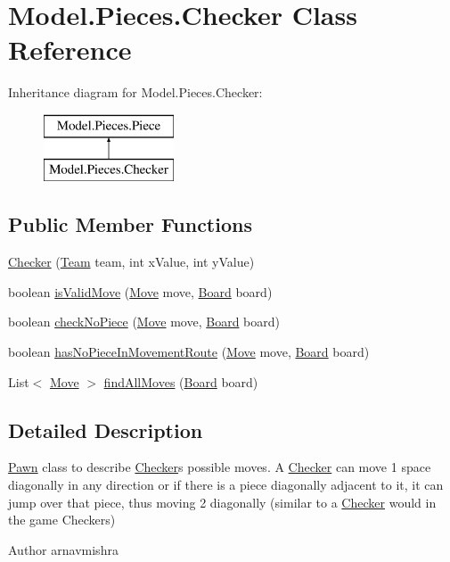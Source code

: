 \hypertarget{class_model_1_1_pieces_1_1_checker}{}\section{Model.\+Pieces.\+Checker Class Reference}
\label{class_model_1_1_pieces_1_1_checker}
Inheritance diagram for Model.\+Pieces.\+Checker\+:\begin{figure}[H]
\begin{center}
\leavevmode
\includegraphics[height=2.000000cm]{class_model_1_1_pieces_1_1_checker}
\end{center}
\end{figure}
\subsection*{Public Member Functions}
\begin{DoxyCompactItemize}
\item 
\hyperlink{class_model_1_1_pieces_1_1_checker_af2b456d3e6c3ceff5a641fac1928fd5a}{Checker} (\hyperlink{class_model_1_1_team}{Team} team, int x\+Value, int y\+Value)
\item 
boolean \hyperlink{class_model_1_1_pieces_1_1_checker_a833ad4dc58dc068f194b30c5eb989d52}{is\+Valid\+Move} (\hyperlink{class_model_1_1_move}{Move} move, \hyperlink{class_model_1_1_board}{Board} board)
\item 
boolean \hyperlink{class_model_1_1_pieces_1_1_checker_a39660db049663a3ee26f041642c31705}{check\+No\+Piece} (\hyperlink{class_model_1_1_move}{Move} move, \hyperlink{class_model_1_1_board}{Board} board)
\item 
boolean \hyperlink{class_model_1_1_pieces_1_1_checker_a493190714612bdc8125c475b41434c75}{has\+No\+Piece\+In\+Movement\+Route} (\hyperlink{class_model_1_1_move}{Move} move, \hyperlink{class_model_1_1_board}{Board} board)
\item 
List$<$ \hyperlink{class_model_1_1_move}{Move} $>$ \hyperlink{class_model_1_1_pieces_1_1_checker_a840159766272906e7d72551c92623eee}{find\+All\+Moves} (\hyperlink{class_model_1_1_board}{Board} board)
\end{DoxyCompactItemize}


\subsection{Detailed Description}
\hyperlink{class_model_1_1_pieces_1_1_pawn}{Pawn} class to describe \hyperlink{class_model_1_1_pieces_1_1_checker}{Checker}\textquotesingle{}s possible moves. A \hyperlink{class_model_1_1_pieces_1_1_checker}{Checker} can move 1 space diagonally in any direction or if there is a piece diagonally adjacent to it, it can jump over that piece, thus moving 2 diagonally (similar to a \hyperlink{class_model_1_1_pieces_1_1_checker}{Checker} would in the game Checkers) \begin{DoxyAuthor}{Author}
arnavmishra 
\end{DoxyAuthor}


